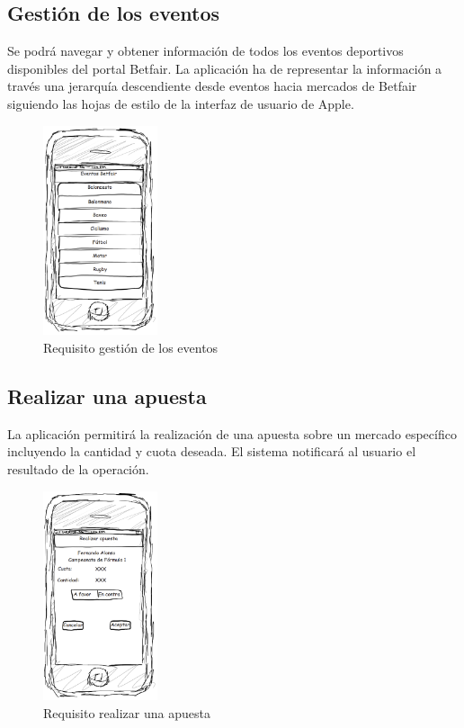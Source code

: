 \subsection{Gestión de los eventos}
Se podrá navegar y obtener información de todos los eventos deportivos disponibles del portal Betfair. La aplicación ha de representar la información a través una jerarquía descendiente desde eventos hacia mercados de Betfair siguiendo las hojas de estilo de la interfaz de usuario de Apple.
\begin{figure}[H]
    \centering
       \includegraphics[width=0.3\textwidth]{./images/req_eventos.png}
     \caption{Requisito gestión de los eventos}
   \label{fig:Requisito eventos}
\end{figure}
\subsection{Realizar una apuesta}
La aplicación permitirá la realización de una apuesta sobre un mercado específico incluyendo la cantidad y cuota deseada. El sistema notificará al usuario el resultado de la operación.
\begin{figure}[H]
    \centering
       \includegraphics[width=0.3\textwidth]{./images/req_apuestas.png}
     \caption{Requisito realizar una apuesta}
   \label{fig:Requisito realizar una apuesta}
\end{figure}
